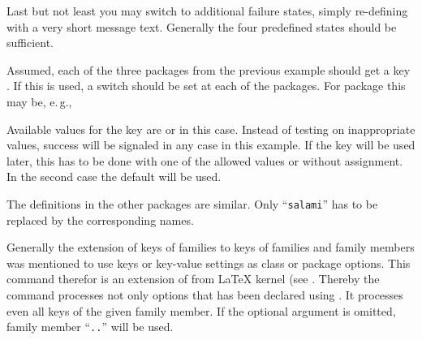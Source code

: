 Last but not least you may switch to additional failure states, simply
re-defining  with a very short message
text. Generally the four predefined states should be sufficient.

\begin{Example}
  Assumed, each of the three packages from the previous example should get a
  key . If this is used, a switch should be set at each of
  the packages. For package  this may be, e.\,g.,
  Available values for the key are  or  in this
  case. Instead of testing on inappropriate values, success will be signaled
  in any case in this example. If the key will be used later, this has to be
  done with one of the allowed values or without assignment. In the second
  case the default  will be used.

  The definitions in the other packages are similar. Only ``\texttt{salami}''
  has to be replaced by the corresponding names.
\end{Example}
%
%
%
%
%
%
%


\begin{Declaration}
\end{Declaration}
%
Generally the extension of keys of families to keys of families and family
members was mentioned to use keys or key-value settings as class or package
options. This command therefor is an extension of  from
\LaTeX{} kernel (see \cite{latex:clsguide}. Thereby the command processes not
only options that has been declared using . It processes
even all keys of the given family member. If the optional argument
 is omitted, family member
``\texttt{.}\texttt{.}'' will be used.

